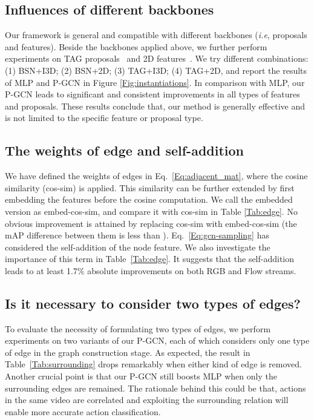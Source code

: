 \documentclass[10pt,twocolumn,letterpaper]{article}
\def\ie{\emph{i.e}\onedot} \def\Ie{\emph{I.e}\onedot}
\begin{document}
\subsection{Influences of different backbones}
	Our framework is general and compatible with different backbones (\ie, proposals and features). Beside the backbones applied above, we further perform experiments on TAG proposals~\cite{zhao2017temporal} and 2D features~\cite{lin2018bsn}.
We try different combinations: (1) BSN+I3D; (2) BSN+2D; (3) TAG+I3D; (4) TAG+2D, and report the results of MLP and P-GCN in Figure \ref{Fig:instantiations}. In comparison with MLP, our P-GCN leads to significant and consistent improvements in all types of features and proposals. These results conclude that, our method is generally effective and is not limited to the specific feature or proposal type. 


	
	
	\subsection{The weights of edge and self-addition}
	
We have defined the weights of edges in Eq.~\eqref{Eq:adjacent_mat}, where the cosine similarity (cos-sim) is applied. This similarity can be further extended by first embedding the features before the cosine computation. We call the embedded version as embed-cos-sim, and compare it with cos-sim in Table \ref{Tab:edge}. 
	No obvious improvement is attained by replacing cos-sim with embed-cos-sim (the mAP difference between them is less than ). Eq.~\eqref{Eq:gcn-sampling} has considered the self-addition of the node feature. We also investigate the importance of this term in Table~\ref{Tab:edge}. It suggests that the self-addition leads to at least 1.7\% absolute improvements on both RGB and Flow streams.


	\subsection{Is it necessary to consider two types of edges?}
	
To evaluate the necessity of formulating two types of edges, we perform experiments on two variants of our P-GCN, each of which considers only one type of edge in the graph construction stage. As expected, the result in Table~\ref{Tab:surrounding} drops remarkably when either kind of edge is removed. 
Another crucial point is that our P-GCN still boosts MLP when only the surrounding edges are remained. The rationale behind this could be that, actions in the same video are correlated and exploiting the surrounding relation will enable more accurate action classification. 
\end{document}
